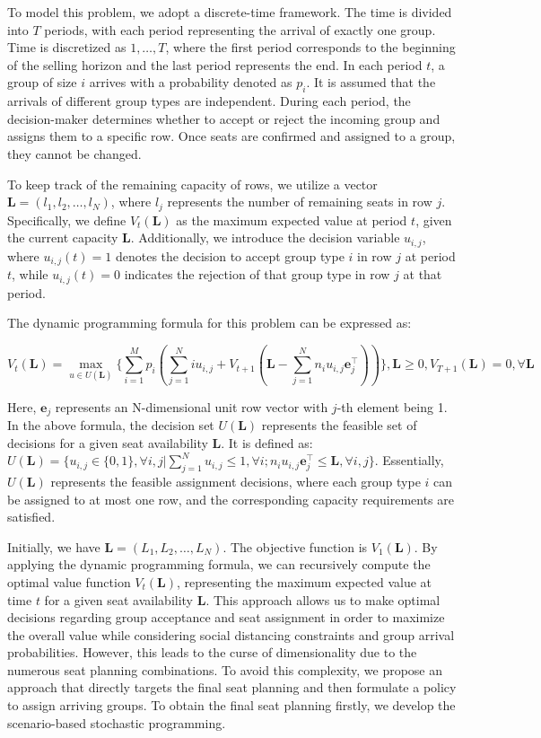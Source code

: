 To model this problem, we adopt a discrete-time framework. The time is divided into $T$ periods, with each period representing the arrival of exactly one group. Time is discretized as $1, \ldots, T$, where the first period corresponds to the beginning of the selling horizon and the last period represents the end. In each period $t$, a group of size $i$ arrives with a probability denoted as $p_i$. It is assumed that the arrivals of different group types are independent. During each period, the decision-maker determines whether to accept or reject the incoming group and assigns them to a specific row. Once seats are confirmed and assigned to a group, they cannot be changed.

To keep track of the remaining capacity of rows, we utilize a vector $\mathbf{L} = (l_1, l_2, \ldots, l_N)$, where $l_j$ represents the number of remaining seats in row $j$. Specifically, we define $V_t(\mathbf{L})$ as the maximum expected value at period $t$, given the current capacity $\mathbf{L}$. Additionally, we introduce the decision variable $u_{i,j}$, where $u_{i,j}(t) = 1$ denotes the decision to accept group type $i$ in row $j$ at period $t$, while $u_{i,j}(t) = 0$ indicates the rejection of that group type in row $j$ at that period.

The dynamic programming formula for this problem can be expressed as:

$$V_{t}(\mathbf{L}) = \max_{u \in U(\mathbf{L})}\{ \sum_{i=1}^{M} p_i ( \sum_{j=1}^{N} i u_{i,j} + V_{t+1}(\mathbf{L}- \sum_{j=1}^{N} n_i u_{i,j}\mathbf{e}_j^{\top} ))\}, \mathbf{L} \geq 0, V_{T+1}(\mathbf{L}) =0, \forall \mathbf{L}$$

Here, $\mathbf{e}_j$ represents an N-dimensional unit row vector with $j$-th element being 1. In the above formula, the decision set $U(\mathbf{L})$ represents the feasible set of decisions for a given seat availability $\mathbf{L}$. It is defined as: $U(\mathbf{L}) = \{u_{i,j} \in\{0,1\}, \forall i,j| \sum_{j=1}^{N} u_{i,j} \leq 1, \forall i; n_{i}u_{i,j}\mathbf{e}_j^{\top} \leq \mathbf{L}, \forall i,j \}$. Essentially, $U(\mathbf{L})$ represents the feasible assignment decisions, where each group type $i$ can be assigned to at most one row, and the corresponding capacity requirements are satisfied.

Initially, we have $\mathbf{L} = (L_1, L_2, \ldots, L_{N})$. The objective function is $V_1(\mathbf{L})$. By applying the dynamic programming formula, we can recursively compute the optimal value function $V_t(\mathbf{L})$, representing the maximum expected value at time $t$ for a given seat availability $\mathbf{L}$. This approach allows us to make optimal decisions regarding group acceptance and seat assignment in order to maximize the overall value while considering social distancing constraints and group arrival probabilities. However, this leads to the curse of dimensionality due to the numerous seat planning combinations. To avoid this complexity, we propose an approach that directly targets the final seat planning and then formulate a policy to assign arriving groups. To obtain the final seat planning firstly, we develop the scenario-based stochastic programming.


